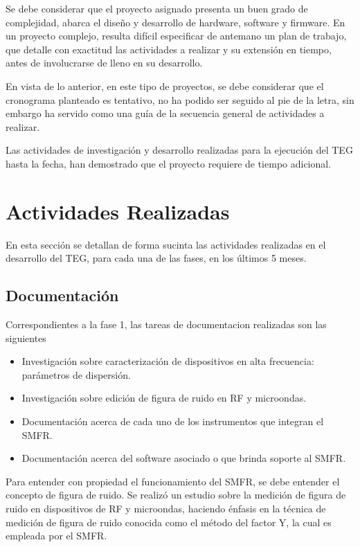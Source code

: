 \documentclass[paper=letter,oneside,fontsize=12pt, parskip=full]{article}
\begin{document}
	Se debe considerar que el proyecto asignado presenta un buen grado de complejidad, 
	abarca el diseño y desarrollo de hardware, software y firmware. En un proyecto complejo, resulta difícil especificar de antemano un plan de trabajo, que detalle con exactitud las actividades a realizar y su extensión en tiempo, antes de involucrarse de lleno en su desarrollo. 
	
	En vista de lo anterior, en este tipo de proyectos, se debe considerar que el cronograma planteado es tentativo, no ha podido ser seguido al pie de la letra, sin embargo ha servido como una guía de la secuencia general de actividades a realizar.

	Las actividades de investigación y desarrollo realizadas para la ejecución del TEG hasta la fecha, han demostrado que el proyecto requiere de tiempo adicional.	

	\section{Actividades Realizadas}
	
	En esta sección se detallan de forma sucinta las actividades realizadas en el desarrollo del TEG, para cada una de las fases, en los últimos 5 meses.
	
	\subsection{Documentación}
	
	Correspondientes a la  fase 1, las tareas de documentacion realizadas son las siguientes
	
	\begin{itemize}
		\item Investigación sobre caracterización de dispositivos en alta frecuencia: parámetros de dispersión.
		\item Investigación sobre edición de figura de ruido en RF y microondas.
		\item Documentación acerca de cada uno de los instrumentos que integran el SMFR.
		\item Documentación acerca del software asociado o que brinda soporte al SMFR.				
	\end{itemize}
	
	
	Para entender con propiedad el funcionamiento del SMFR, se debe entender el concepto de figura de ruido. Se realizó un estudio sobre la medición de figura de ruido en dispositivos de RF y microondas, haciendo énfasis en la técnica de medición de figura de ruido conocida como el método del factor Y, la cual es empleada por el SMFR.
	
\end{document}
